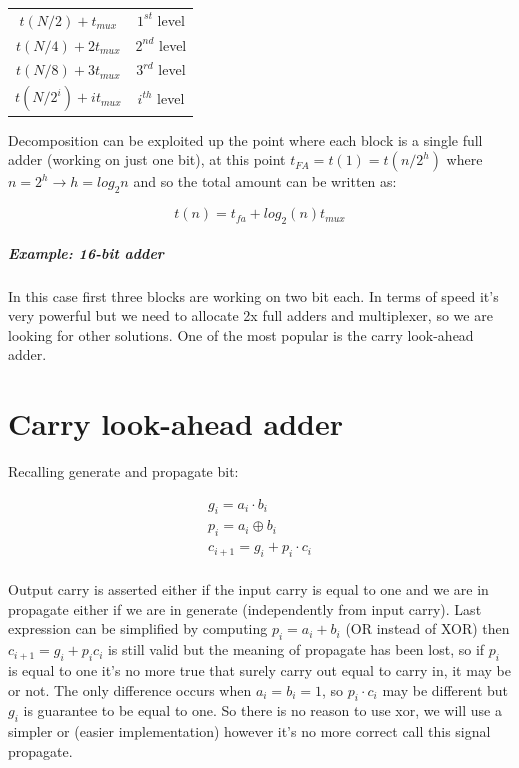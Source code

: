 \begin{center}
\begin{tabular}{|c|c|}
  \hline
  $t(N/2)+t_{mux}$&     $1^{st}$ level\\
  $t(N/4)+2t_{mux}$&    $2^{nd}$ level\\
  $t(N/8)+3t_{mux}$&    $3^{rd}$ level\\
  $t(N/2^i)+it_{mux}$&  $i^{th}$ level\\
  \hline
\end{tabular}
\end{center}

Decomposition can be exploited up the point where each block is a single full adder (working on just one bit), at this point $t_{FA}=t(1)=t(n/2^h)$  where $n=2^h \rightarrow h=log_2 n$
and so the total amount can be written as:

$$t(n)=t_{fa}+log_2(n) t_{mux}$$

\subparagraph{Example: 16-bit adder}

In this case first three blocks are working on two bit each. In terms of speed it's very powerful but we need to allocate 2x full adders and multiplexer, so we are looking for other solutions. One of the most popular is the carry look-ahead adder.

\section{Carry look-ahead adder}
 Recalling generate and propagate bit:

 \begin{eqnarray*}
 g_i=a_i \cdot b_i\\
 p_i=a_i \oplus b_i\\
 c_{i+1}=g_i+p_i \cdot c_i\\
 \end{eqnarray*}

Output carry is asserted either if the input carry is equal to one and we are in propagate either if we are in generate (independently from input carry). Last expression can be simplified by computing $p_i=a_i + b_i$ (OR instead of XOR) then $c_{i+1}=g_i+p_i c_i$ is still valid but the meaning of propagate has been lost, so if $p_i$ is equal to one it's no more true that surely carry out equal to carry in, it may be or not. The only difference occurs when $a_i=b_i=1$, so $p_i \cdot c_i$ may be different but $g_i$ is guarantee to be equal to one. So there is no reason to use xor, we will use a simpler or (easier implementation) however it's no more correct call this signal propagate.\\

